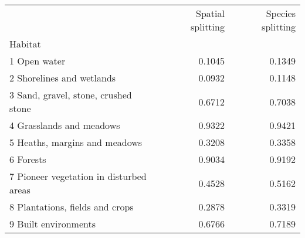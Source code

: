 \begin{tabular}{lrr}
\toprule
{} &  Spatial splitting &  Species splitting \\
Habitat                                 &                    &                    \\
\midrule
1 Open water                            &             0.1045 &             0.1349 \\
2 Shorelines and wetlands               &             0.0932 &             0.1148 \\
3 Sand, gravel, stone, crushed stone    &             0.6712 &             0.7038 \\
4 Grasslands and meadows                &             0.9322 &             0.9421 \\
5 Heaths, margins and meadows           &             0.3208 &             0.3358 \\
6 Forests                               &             0.9034 &             0.9192 \\
7 Pioneer vegetation in disturbed areas &             0.4528 &             0.5162 \\
8 Plantations, fields and crops         &             0.2878 &             0.3319 \\
9 Built environments                    &             0.6766 &             0.7189 \\
\bottomrule
\end{tabular}

